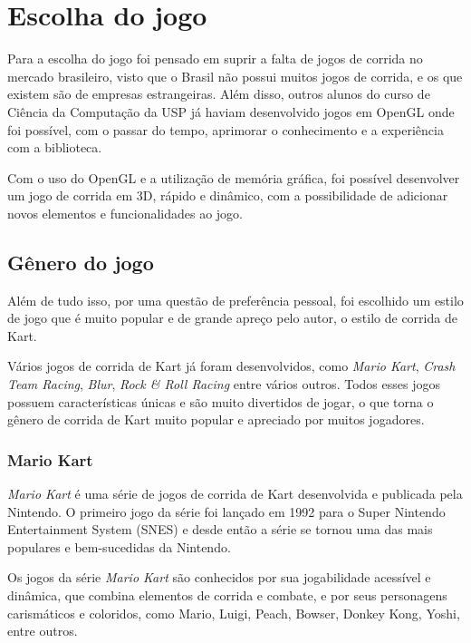 \chapter{Escolha do jogo}

Para a escolha do jogo foi pensado em suprir a falta de jogos de corrida no mercado brasileiro, visto que o Brasil não possui muitos jogos de corrida, e os que existem são de empresas estrangeiras. Além disso, outros alunos do curso de Ciência da Computação da USP já haviam desenvolvido jogos em OpenGL onde foi possível, com o passar do tempo, aprimorar o conhecimento e a experiência com a biblioteca.

Com o uso do OpenGL e a utilização de memória gráfica, foi possível desenvolver um jogo de corrida em 3D, rápido e dinâmico, com a possibilidade de adicionar novos elementos e funcionalidades ao jogo.

\section{Gênero do jogo}

Além de tudo isso, por uma questão de preferência pessoal, foi escolhido um estilo de jogo que é muito popular e de grande apreço pelo autor, o estilo de corrida de Kart.

Vários jogos de corrida de Kart já foram desenvolvidos, como \textit{Mario Kart}, \textit{Crash Team Racing}, \textit{Blur}, \textit{Rock \& Roll Racing} entre vários outros. Todos esses jogos possuem características únicas e são muito divertidos de jogar, o que torna o gênero de corrida de Kart muito popular e apreciado por muitos jogadores.

\subsection{Mario Kart}

\textit{Mario Kart} é uma série de jogos de corrida de Kart desenvolvida e publicada pela Nintendo. O primeiro jogo da série foi lançado em 1992 para o Super Nintendo Entertainment System (SNES) e desde então a série se tornou uma das mais populares e bem-sucedidas da Nintendo.

Os jogos da série \textit{Mario Kart} são conhecidos por sua jogabilidade acessível e dinâmica, que combina elementos de corrida e combate, e por seus personagens carismáticos e coloridos, como Mario, Luigi, Peach, Bowser, Donkey Kong, Yoshi, entre outros.

